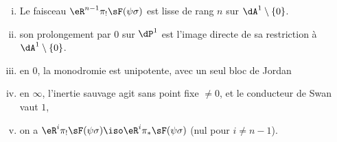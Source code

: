 \begin{theorem_}\label{VI:7-8}
\begin{enumerate}[(i)]
  \item Le faisceau $\eR^{n-1}\pi_! \sF(\psi\sigma)$ est lisse de rang $n$ sur 
    $\dA^1\setminus \{0\}$. 
  \item son prolongement par $0$ sur $\dP^1$ est l'image directe de sa 
    restriction à $\dA^1\setminus \{0\}$. 
\item en $0$, la monodromie est unipotente, avec un seul bloc de Jordan
  \item en $\infty$, l'inertie sauvage agit sans point fixe $\ne 0$, et le 
    conducteur de Swan vaut $1$, 
  \item on a $\eR^i \pi_! \sF(\psi\sigma) \iso \eR^i \pi_\ast \sF(\psi\sigma)$ 
    (nul pour $i\ne n-1$).
\end{enumerate}
\end{theorem_}
